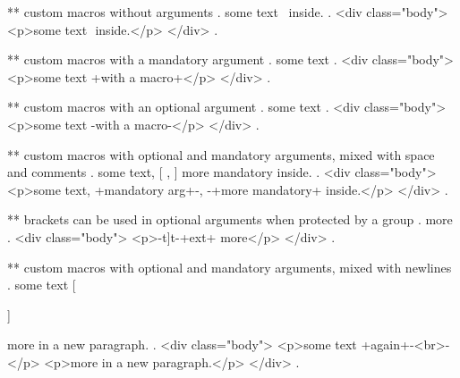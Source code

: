 ** custom macros without arguments
.
some text \empty\ inside.
.
<div class="body">
<p>some text ​ inside.</p>
</div>
.

** custom macros with a mandatory argument
.
some text 
.
<div class="body">
<p>some text +with a macro+</p>
</div>
.

** custom macros with an optional argument
.
some text 
.
<div class="body">
<p>some text -with a macro-</p>
</div>
.


** custom macros with optional and mandatory arguments, mixed with space and comments
.
some text,  [%
,  %
 ]
 {more mandatory} inside.
.
<div class="body">
<p>some text, +mandatory arg+-, -+more mandatory+ inside.</p>
</div>
.


** brackets can be used in optional arguments when protected by a group
.
\echoOGO[{t]}t]{ext} more
.
<div class="body">
<p>-t]t-+ext+ more</p>
</div>
.



** custom macros with optional and mandatory arguments, mixed with newlines
.
some text  [ %

 ]%

  {more} in a new paragraph.
.
<div class="body">
<p>some text +again+-<br>-</p>
<p>more​ in a new paragraph.</p>
</div>
.
